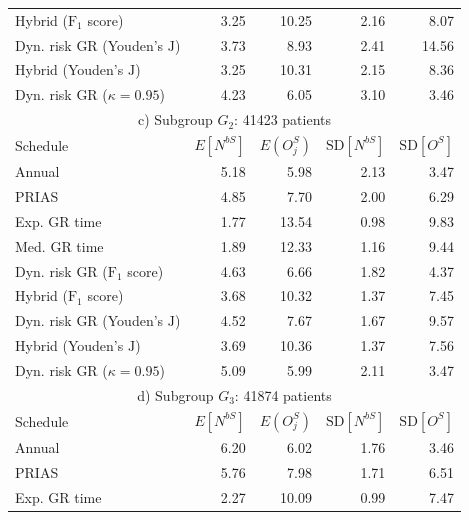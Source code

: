 \begin{table}[!htb]
\begin{tabular}{lrrrr}
Hybrid ($\mbox{F}_1$ score)       & 3.25            & 10.25               & 2.16          & 8.07              \\
Dyn. risk GR (Youden's $\mbox{J}$)      & 3.73            & 8.93                & 2.41          & 14.56            \\
Hybrid (Youden's $\mbox{J}$)   & 3.25            & 10.31                & 2.15          & 8.36              \\
Dyn. risk GR ($\kappa=0.95$) & 4.23 & 6.05 & 3.10 & 3.46\\
\hline      
\multicolumn{5}{c}{c) Subgroup $G_2$: 41423 patients}\\
\hline
Schedule        & $E[N^{bS}]$ & $E(O^S_j)$ & ${\mbox{SD}[N^{bS}]}$ & ${\mbox{SD}[O^S]}$ \\
\hline
Annual         & 5.18            & 5.98                & 2.13          & 3.47              \\
PRIAS          & 4.85            & 7.70                & 2.00          & 6.29        \\
Exp. GR time & 1.77            & 13.54               & 0.98          & 9.83              \\
Med. GR time & 1.89             & 12.33               & 1.16          & 9.44              \\
Dyn. risk GR ($\mbox{F}_1$ score)       & 4.63            & 6.66                & 1.82          & 4.37              \\
Hybrid ($\mbox{F}_1$ score)       & 3.68            & 10.32                & 1.37          & 7.45              \\
Dyn. risk GR (Youden's $\mbox{J}$)      & 4.52            & 7.67                & 1.67          & 9.57           \\
Hybrid (Youden's $\mbox{J}$)   & 3.69             & 10.36               & 1.37          & 7.56              \\
Dyn. risk GR ($\kappa=0.95$) & 5.09 & 5.99 & 2.11 & 3.47\\
\hline      
\multicolumn{5}{c}{d) Subgroup $G_3$: 41874 patients}\\
\hline
Schedule        & $E[N^{bS}]$ & $E(O^S_j)$ & ${\mbox{SD}[N^{bS}]}$ & ${\mbox{SD}[O^S]}$ \\
\hline
Annual         & 6.20             & 6.02                & 1.76          & 3.46              \\
PRIAS          & 5.76             & 7.98                & 1.71         & 6.51        \\
Exp. GR time & 2.27            & 10.09               & 0.99          & 7.47              \\

\end{tabular}
\end{table}
